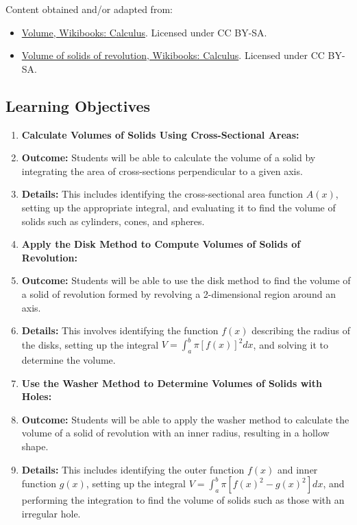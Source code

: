 Content obtained and/or adapted from:

\begin{itemize}

\item \href{https://en.wikibooks.org/wiki/Calculus/Volume}{Volume, Wikibooks: Calculus}.  
Licensed under CC BY-SA.

\item \href{https://en.wikibooks.org/wiki/Calculus/Volume_of_solids_of_revolution}{Volume of solids of revolution, Wikibooks: Calculus}.  
Licensed under CC BY-SA.

\end{itemize}

\subsection{Learning Objectives}

\begin{enumerate}
    \item \textbf{Calculate Volumes of Solids Using Cross-Sectional Areas:}
    \item \textbf{Outcome:} Students will be able to calculate the volume of a solid by integrating the area of cross-sections perpendicular to a given axis.
    \item \textbf{Details:} This includes identifying the cross-sectional area function \( A(x) \), setting up the appropriate integral, and evaluating it to find the volume of solids such as cylinders, cones, and spheres.
    \item \textbf{Apply the Disk Method to Compute Volumes of Solids of Revolution:}
    \item \textbf{Outcome:} Students will be able to use the disk method to find the volume of a solid of revolution formed by revolving a 2-dimensional region around an axis.
    \item \textbf{Details:} This involves identifying the function \( f(x) \) describing the radius of the disks, setting up the integral \( V = \int_a^b \pi [f(x)]^2 dx \), and solving it to determine the volume.
    \item \textbf{Use the Washer Method to Determine Volumes of Solids with Holes:}
    \item \textbf{Outcome:} Students will be able to apply the washer method to calculate the volume of a solid of revolution with an inner radius, resulting in a hollow shape.
    \item \textbf{Details:} This includes identifying the outer function \( f(x) \) and inner function \( g(x) \), setting up the integral \( V = \int_a^b \pi [f(x)^2 - g(x)^2] dx \), and performing the integration to find the volume of solids such as those with an irregular hole.
\end{enumerate}

